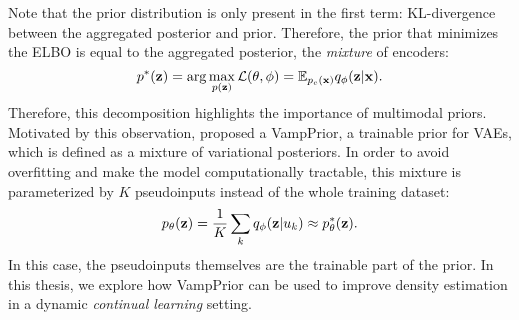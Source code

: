 Note that the prior distribution is only present in the first term: KL-divergence between the aggregated posterior and prior. Therefore, the prior that minimizes the ELBO is equal to the aggregated posterior, the \textit{mixture} of encoders:
\begin{equation}
    p^*({\mathbf{z}}) = \arg\max_{p({\mathbf{z}})}\mathcal{L}(\theta, \phi) = \mathbb{E}_{p_e({\mathbf{x}})}q_{\phi}({\mathbf{z}}|{\mathbf{x}}).
\end{equation}
Therefore, this decomposition highlights the importance of multimodal priors. 
Motivated by this observation, \citet{tomczak2018vae} proposed a VampPrior, a trainable prior for VAEs, which is defined as a mixture of variational posteriors. In order to avoid overfitting and make the model computationally tractable, this mixture is parameterized by $K$ pseudoinputs instead of the whole training dataset:
\begin{equation}
    p_{\theta}({\mathbf{z}}) = \frac1K \sum_k q_{\phi}({\mathbf{z}}|u_k) \approx p_{\theta}^*({\mathbf{z}}).
\end{equation}
In this case, the pseudoinputs themselves are the trainable part of the prior. In this thesis, we explore how VampPrior can be used to improve density estimation in a dynamic \textit{continual learning} setting. 



